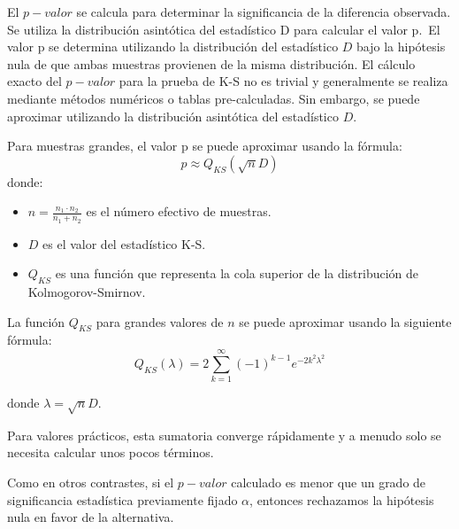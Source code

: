 \documentclass[
  letterpaper,
  DIV=11,
  numbers=noendperiod]{scrreprt}
\providecommand{\tightlist}{%
  \setlength{\itemsep}{0pt}\setlength{\parskip}{0pt}}\usepackage{longtable,booktabs,array}
\begin{document}
El \(p-valor\) se calcula para determinar la significancia de la
diferencia observada. Se utiliza la distribución asintótica del
estadístico D para calcular el valor p.~El valor p se determina
utilizando la distribución del estadístico \(D\) bajo la hipótesis nula
de que ambas muestras provienen de la misma distribución. El cálculo
exacto del \(p-valor\) para la prueba de K-S no es trivial y
generalmente se realiza mediante métodos numéricos o tablas
pre-calculadas. Sin embargo, se puede aproximar utilizando la
distribución asintótica del estadístico \(D\).

Para muestras grandes, el valor p se puede aproximar usando la fórmula:
\[
 p \approx Q_{KS}(\sqrt{n} D) 
\] donde:

\begin{itemize}
\tightlist
\item
  \(n = \frac{n_1 \cdot n_2}{n_1 + n_2}\) es el número efectivo de
  muestras.
\item
  \(D\) es el valor del estadístico K-S.
\item
  \(Q_{KS}\) es una función que representa la cola superior de la
  distribución de Kolmogorov-Smirnov.
\end{itemize}

La función \(Q_{KS}\) para grandes valores de \(n\) se puede aproximar
usando la siguiente fórmula: \[
 Q_{KS}(\lambda) = 2 \sum_{k=1}^{\infty} (-1)^{k-1} e^{-2k^2 \lambda^2} 
 \]

donde \(\lambda = \sqrt{n} D\).

Para valores prácticos, esta sumatoria converge rápidamente y a menudo
solo se necesita calcular unos pocos términos.

Como en otros contrastes, si el \(p-valor\) calculado es menor que un
grado de significancia estadística previamente fijado \(\alpha\),
entonces rechazamos la hipótesis nula en favor de la alternativa.
\end{document}
